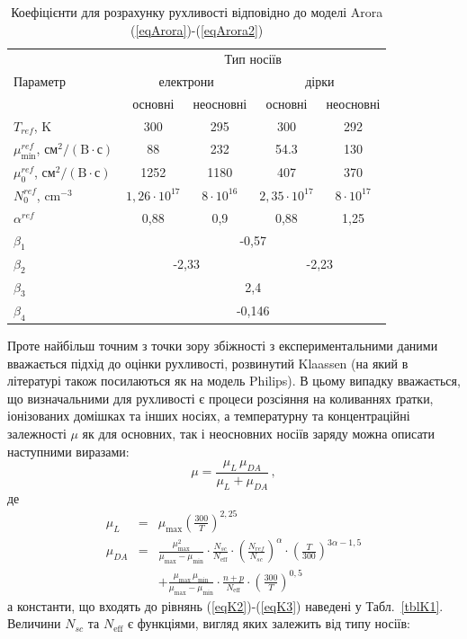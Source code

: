 \documentclass[10pt,a5paper,titlepage,oneside]{book}
\numberwithin{equation}{part}
\begin{document}
\begin{table}
\caption{Коефіцієнти для розрахунку рухливості відповідно до моделі Arora (\ref{eqArora})-(\ref{eqArora2})}
\label{tblArora}
\centering
\begin{tabular}{|l|c|c|c|c|}
\hline
\multirow{3}{*}{Параметр} & \multicolumn{4}{c|}{Тип носіїв}\\
\cline{2-5}
&\multicolumn{2}{c|}{електрони}&\multicolumn{2}{c|}{дірки}\\
\cline{2-5}
& основні \cite{Arora1982}& неосновні \cite{Swirhun1986}& основні \cite{Arora1982}& неосновні \cite{Alamo1985}\\
\hline
$T_{ref}$, K&300&295&300&292\\
\hline
$\mu_\mathrm{min}^{ref}$, $\text{см}^2/(\text{B}\cdot\text{с})$&88&232&54.3&130\\
\hline
$\mu_0^{ref}$, $\text{см}^2/(\text{B}\cdot\text{с})$&1252&1180&407&370\\
\hline
$N_0^{ref}$, cm$^{-3}$&$1,26\cdot10^{17}$&$8\cdot10^{16}$&$2,35\cdot10^{17}$&$8\cdot10^{17}$\\
\hline
$\alpha^{ref}$&0,88&0,9&0,88&1,25\\
\hline
$\beta_1$&\multicolumn{4}{c|}{-0,57}\\
\hline
$\beta_2$&\multicolumn{2}{c|}{-2,33}&\multicolumn{2}{c|}{-2,23}\\
\hline
$\beta_3$&\multicolumn{4}{c|}{2,4}\\
\hline
$\beta_4$&\multicolumn{4}{c|}{-0,146}\\
\hline
\end{tabular}
\end{table}

Проте найбільш точним з точки зору збіжності з експериментальними даними вважається підхід до оцінки рухливості, розвинутий   Klaassen \cite{KLAASSEN953}
(на який в  літературі також посилаються як на модель Philips).
В цьому випадку вважається, що визначальними для рухливості є процеси розсіяння на коливаннях ґратки, іонізованих домішках та інших носіях, а температурну та
концентраційні залежності $\mu$ як для основних, так і неосновних носіїв заряду можна описати наступними виразами:
\begin{equation}\label{eqK1}
  \mu=\frac{\mu_L\,\mu_{DA}}{\mu_L+\mu_{DA}}\,,
\end{equation}
де
\begin{eqnarray}
  \label{eqK2}
  \mu_L &=&  \mu_\mathrm{max} \left(\frac{300}{T}\right)^{2,25}\, \\ \label{eqK3}
 \nonumber  \mu_{DA}  &=& \frac{\mu_\mathrm{max}^2}{\mu_\mathrm{max} - \mu_\mathrm{min}} \cdot
    \frac{N_{sc}}{N_\mathrm{eff}} \cdot \left(\frac{N_{ref}}{N_{sc}}\right)^{\alpha} \cdot \left(\frac{T}{300}\right)^{3\alpha - 1,5}\\
    &&+ \frac{\mu_\mathrm{max} \, \mu_\mathrm{min}}{\mu_\mathrm{max} - \mu_\mathrm{min}} \cdot \frac{n + p}{N_\mathrm{eff}} \cdot \left(\frac{300}{T}\right)^{0,5}\,
\end{eqnarray}
а константи, що входять до рівнянь (\ref{eqK2})-(\ref{eqK3}) наведені у Табл.~\ref{tblK1}.
Величини $N_{sc}$ та $N_\mathrm{eff}$ є функціями, вигляд яких залежить від типу носіїв:
\end{document}
